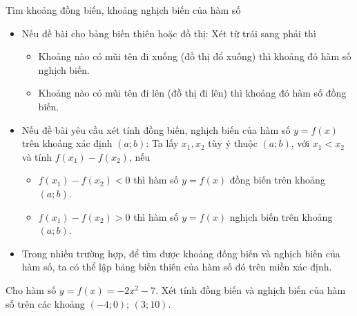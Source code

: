 \begin{dang}{Tìm khoảng đồng biến, khoảng nghịch biến của hàm số}
\begin{itemize}
	\item[\faPencilSquareO] Nếu đề bài cho bảng biến thiên hoặc đồ thị: Xét từ trái sang phải thì
	\begin{itemize}
		\item [$\bullet$] Khoảng nào có mũi tên đi xuống (đồ thị đổ xuống) thì khoảng đó hàm số nghịch biến.
		\item [$\bullet$] Khoảng nào có mũi tên đi lên (đồ thị đi lên) thì khoảng đó hàm số đồng biến.
	\end{itemize}
	\item[\faPencilSquareO] Nếu đề bài yêu cầu xét tính đồng biến, nghịch biến của hàm số $y=f(x)$ trên khoảng xác định $(a;b)$:  Ta lấy $x_1, x_2$ tùy ý thuộc $(a;b)$, với $x_1<x_2$ và tính $f(x_1)-f(x_2)$, nếu
	\begin{itemize}
		\item [$\bullet$] $f(x_1)-f(x_2)<0$ thì hàm số $y=f(x)$ đồng biến trên khoảng $(a;b)$.
		\item [$\bullet$] $f(x_1)-f(x_2)>0$ thì hàm số $y=f(x)$ nghịch biến trên khoảng $(a;b)$.
	\end{itemize}
	\item[\faPencilSquareO] Trong nhiều trường hợp, để tìm được khoảng đồng biến và nghịch biến của hàm số, ta có thể lập bảng biến thiên của hàm số đó trên miền xác định.
\end{itemize}
\end{dang}
\begin{vd}
\end{vd}
\begin{vd}
	Cho hàm số $y=f(x)=-2x^2-7$. Xét tính đồng biến và nghịch biến của hàm số trên các khoảng $(-4;0)$; $(3;10)$.
\end{vd}

